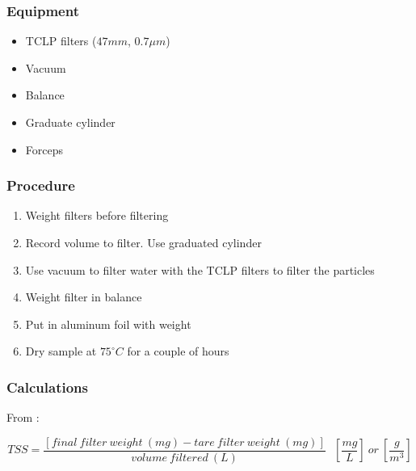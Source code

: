 \begin{appendices}
\subsubsection{Equipment}
\begin{itemize}[itemsep=2pt,parsep=2pt]

  \item TCLP filters ($47 mm$, $0.7\mu m$)
  \item Vacuum
  \item Balance
  \item Graduate cylinder
  \item Forceps

\end{itemize}

\subsubsection{Procedure}
\begin{enumerate}[itemsep=2pt,parsep=2pt]
  \item Weight filters before filtering
  \item Record volume to filter. Use graduated cylinder
  \item Use vacuum to filter water with the TCLP filters to filter the particles
  \item Weight filter in balance
  \item Put in aluminum foil with weight
  \item Dry sample at $75^\circ C$ for a couple of hours
\end{enumerate}

\subsubsection{Calculations}
From \cite{Tyler2013_SPM_protocol}:

\begin{equation}
TSS = \frac{[final~filter~weight~(mg) - tare~filter~weight~(mg)]}{volume~filtered~(L)}~~~\left[\frac{mg}{L}\right]~or~\left[\frac{g}{m^3}\right]
\end{equation}




\end{appendices}
